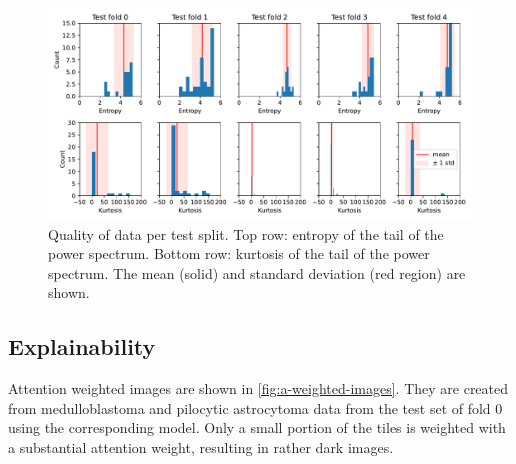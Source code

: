 \begin{figure}
    \centering
    \includegraphics[width=\linewidth]{pediatric-brain-tumours/images/entropy-kurtosis-per-fold-split-test.pdf}
    \caption[Quality of data per test split]{
        Quality of data per test split.
        Top row: entropy of the tail of the power spectrum.
        Bottom row: kurtosis of the tail of the power spectrum.
        The mean (solid) and standard deviation (red region) are shown.
    }
    \label{fig:data-quality-per-fold}
\end{figure}

\subsection{Explainability}
Attention weighted images are shown in \cref{fig:a-weighted-images}.
They are created from medulloblastoma and pilocytic astrocytoma data from the test set of fold 0 using the corresponding model.
Only a small portion of the tiles is weighted with a substantial attention weight, resulting in rather dark images.

